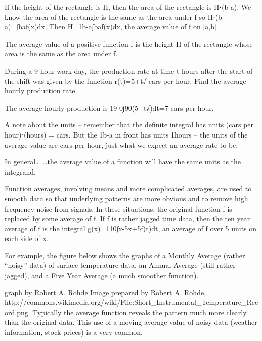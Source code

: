 If the height of the rectangle is H, then the area of the rectangle is H⋅(b-a). We know the area of the rectangle is the same as the area under f so H⋅(b-a)=∫baf(x)dx. Then
H=1b-a∫baf(x)dx,
the average value of f on [a,b].

The average value of a positive function f is the height H of the rectangle whose area is the same as the area under f.

\begin{example}
During a 9 hour work day, the production rate at time t hours after the start of the shift was given by the function r(t)=5+t√ cars per hour. Find the average hourly production rate.

\begin{solution}
The average hourly production is 19-0∫90(5+t√)dt=7 cars per hour.
\end{solution}\end{example}

A note about the units – remember that the definite integral has units (cars per hour)⋅(hours) = cars. But the 1b-a in front has units 1hours – the units of the average value are cars per hour, just what we expect an average rate to be.

In general…
…the average value of a function will have the same units as the integrand.

Function averages, involving means and more complicated averages, are used to smooth data so that underlying patterns are more obvious and to remove high frequency noise from signals. In these situations, the original function f is replaced by some average of f. If f is rather jagged time data, then the ten year average of f is the integral g(x)=110∫x-5x+5f(t)dt, an average of f over 5 units on each side of x.

For example, the figure below shows the graphs of a Monthly Average (rather “noisy” data) of surface temperature data, an Annual Average (still rather jagged), and a Five Year Average (a much smoother function).

graph by Robert A. Rohde
Image prepared by Robert A. Rohde, http://commons.wikimedia.org/wiki/File:Short_Instrumental_Temperature_Record.png.
Typically the average function reveals the pattern much more clearly than the original data. This use of a moving average value of noisy data (weather information, stock prices) is a very common.

